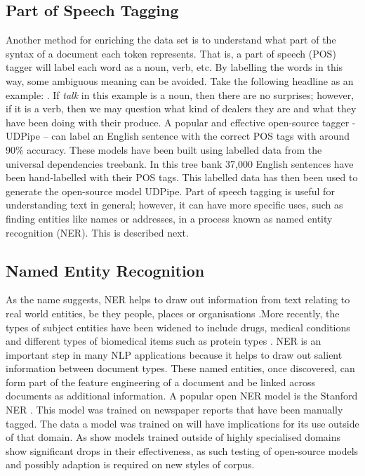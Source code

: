  \subsection{Part of Speech Tagging}Another method for enriching the data set is to understand what part of the syntax of a document each token represents. That is, a part of speech (POS) tagger will label each word as a noun, verb, etc. By labelling the words in this way, some ambiguous meaning can be avoided. Take the following headline as an example: . If \emph{talk} in this example is a noun, then there are no surprises; however, if it is a verb, then we may question what kind of dealers they are and what they have been doing with their produce. A popular and effective  \parencite{zeman-etal-2018-conll} open-source tagger - UDPipe \parencite{straka-2018-udpipe} – can label an English sentence with the correct POS tags with around 90\% accuracy. These models have been built using labelled data from the universal dependencies treebank. In this tree bank 37,000 English sentences have been hand-labelled with their POS tags. This labelled data has then been used to generate the open-source model UDPipe. Part of speech tagging is useful for understanding text in general; however, it can have more specific uses, such as finding entities like names or addresses, in a process known as named entity recognition (NER). This is described next.
  
\subsection{Named Entity Recognition} As the name suggests, NER helps to draw out information from text relating to real world entities, be they people, places or organisations  \parencite{eisenstein2018natural}.More recently, the types of subject entities have been widened to include drugs, medical conditions and different types of biomedical items such as protein types  \parencite{goyal2018recent}. NER is an important step in many NLP applications because it helps to draw out salient information between document types. These named entities, once discovered, can form part of the feature engineering of a document and be linked across documents as additional information. A popular open NER model is the Stanford NER \parencite{finkel2005incorporating}. This model was trained on newspaper reports that have been manually tagged. The data a model was trained on will have implications for its use outside of that domain. As \textcite{prokofyev2014effective} show models trained outside of highly specialised domains show significant drops in their effectiveness, as such testing of open-source models and possibly adaption is required on new styles of corpus.


